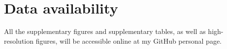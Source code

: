
% 

{
\chapter*{\vspace{-3.5cm}Data availability}
\label{data_availability}
}

All the supplementary figures and supplementary tables, as well as high-resolution figures, will be accessible online at my GitHub personal page.

% 